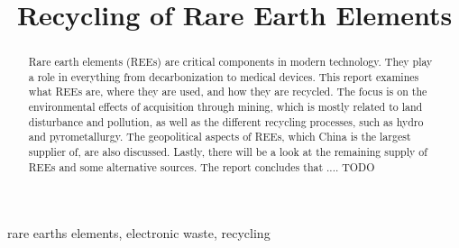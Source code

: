 \documentclass[conference]{IEEEtran}
\begin{document}
\title{Recycling of Rare Earth Elements}

\author{
}

\maketitle

\begin{abstract}
    Rare earth elements (REEs) are critical components in modern technology. They play a role in everything from decarbonization to medical devices. This report examines what REEs are, where they are used, and how they are recycled. The focus is on the environmental effects of acquisition through mining, which is mostly related to land disturbance and pollution, as well as the different recycling processes, such as hydro and pyrometallurgy. The geopolitical aspects of REEs, which China is the largest supplier of, are also discussed. Lastly, there will be a look at the remaining supply of REEs and some alternative sources. The report concludes that .... TODO
\end{abstract}

\begin{IEEEkeywords}
rare earths elements, electronic waste, recycling
\end{IEEEkeywords}















\printbibliography
\end{document}
